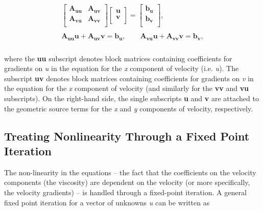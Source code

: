 \begin{align*}
\begin{matrix}
  \left[ \begin{matrix}
   \mathbf{A}_{\mathbf{uu}} & \mathbf{A}_{\mathbf{uv}}  \\
   \mathbf{A}_{\mathbf{vu}} & \mathbf{A}_{\mathbf{vv}}  \\
\end{matrix} \right]\left[ \begin{matrix}
   \mathbf{u}  \\
   \mathbf{v}  \\
\end{matrix} \right]=\left[ \begin{matrix}
   \mathbf{b}_{\mathbf{u}}  \\
   \mathbf{b}_{\mathbf{v}}  \\
\end{matrix} \right], \\ 
   \\ 
  \mathbf{A}_{\mathbf{uu}}\mathbf{u} + \mathbf{A}_{\mathbf{uv}}\mathbf{v} =\mathbf{b}_{\mathbf{u}},
  \quad \quad \mathbf{A}_{\mathbf{vu}}\mathbf{u} + \mathbf{A}_{\mathbf{vv}}\mathbf{v} =\mathbf{b}_{\mathbf{v}}, \\ 
\end{matrix}
\end{align*}

where the \textbf{uu} subscript denotes block matrices containing coefficients for gradients on \textit{u} in the equation for the \textit{x} component of velocity (i.e. \textit{u}). The subscript \textbf{uv} denotes block matrices containing coefficients for gradients on \textit{v} in the equation for the \textit{x} component of velocity (and similarly for the \textbf{vv} and \textbf{vu} subscripts). On the right-hand side, the single subscripts \textbf{u} and \textbf{v} are attached to the geometric source terms for the \textit{x} and \textit{y} components of velocity, respectively.

\subsection{Treating Nonlinearity Through a Fixed Point Iteration}
The non-linearity in the equations -- the fact that the coefficients on the velocity components (the viscosity) are dependent on the velocity (or more specifically, the velocity gradients) -- is handled through a fixed-point iteration. A general fixed point iteration for a vector of unknowns \textit{u} can be written as 

